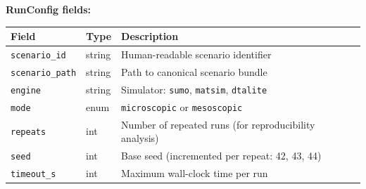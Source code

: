 \begin{Shaded}
\begin{Highlighting}[]
\KeywordTok{:}
\KeywordTok{:}
\KeywordTok{:}

\KeywordTok{:}
\AttributeTok{  }\KeywordTok{{-}}\AttributeTok{ }\KeywordTok{:}
\AttributeTok{    }\KeywordTok{:}
\AttributeTok{    }\KeywordTok{:}
\AttributeTok{    }\KeywordTok{:}
\AttributeTok{    }\KeywordTok{:}\AttributeTok{ }
\AttributeTok{    }\KeywordTok{:}\AttributeTok{ }
\AttributeTok{    }\KeywordTok{:}\AttributeTok{ }

\AttributeTok{  }\KeywordTok{{-}}\AttributeTok{ }\KeywordTok{:}
\AttributeTok{    }\KeywordTok{:}
\AttributeTok{    }\KeywordTok{:}
\AttributeTok{    }\KeywordTok{:}
\AttributeTok{    }\KeywordTok{:}\AttributeTok{ }
\AttributeTok{    }\KeywordTok{:}\AttributeTok{ }
\AttributeTok{    }\KeywordTok{:}\AttributeTok{ }
\end{Highlighting}
\end{Shaded}

\textbf{RunConfig fields:}

\begin{longtable}[]{@{}lll@{}}
\toprule\noalign{}
Field & Type & Description \\
\midrule\noalign{}
\endhead
\bottomrule\noalign{}
\endlastfoot
\texttt{scenario\_id} & string & Human-readable scenario identifier \\
\texttt{scenario\_path} & string & Path to canonical scenario bundle \\
\texttt{engine} & string & Simulator: \texttt{sumo}, \texttt{matsim},
\texttt{dtalite} \\
\texttt{mode} & enum & \texttt{microscopic} or \texttt{mesoscopic} \\
\texttt{repeats} & int & Number of repeated runs (for reproducibility
analysis) \\
\texttt{seed} & int & Base seed (incremented per repeat: 42, 43, 44) \\
\texttt{timeout\_s} & int & Maximum wall-clock time per run \\
\end{longtable}

